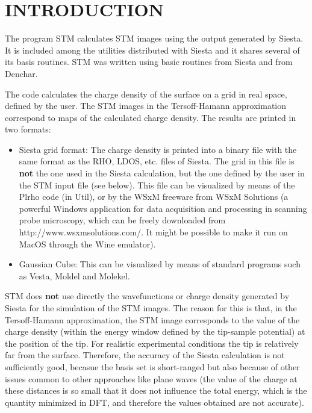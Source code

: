 
\tableofcontents

\newpage



\section{INTRODUCTION}

The program {\sc STM} calculates STM images using the output
generated by {\sc Siesta}.
It is included among the utilities distributed with {\sc Siesta}
and it shares several of its basis routines. 
{\sc STM} was written using basic routines from 
{\sc Siesta} and from {\sc Denchar}.

The code calculates the charge density of the surface
on a grid in real space, defined by the user. The STM images
in the Tersoff-Hamann approximation correspond to maps of
the calculated charge density. 
The results are printed in two formats:

\begin{itemize} 

\item{{\sc Siesta} grid format:}
The charge density is printed into a binary file with the same
format as the RHO, LDOS, etc. files of {\sc Siesta}. The grid
in this file is {\bf not} the one used in the {\sc Siesta}
calculation, but the one defined by the user in the {\sc STM}
input file (see below).
This file can be visualized by means of the {\sc Plrho}
code (in Util), or by the WSxM freeware from WSxM Solutions
(a powerful Windows application for data 
acquisition and processing in scanning probe microscopy,
which can be freely downloaded from http://www.wsxmsolutions.com/. It
might be possible to make it run on MacOS through the Wine emulator).


\item{Gaussian Cube:}
This can be visualized by means of standard programs
such as {\sc Vesta}, {\sc Moldel} and {\sc Molekel}.


\end{itemize}

{\sc STM} does {\bf not} use directly the wavefunctions or charge density
generated by {\sc Siesta} for the simulation of the STM images. The
reason for this is that, in the Tersoff-Hamann approximation,
the STM image corresponds to the value of the charge density
(within the energy window defined by the tip-sample potential)
at the position of the tip. For realistic experimental conditions
the tip is relatively far from the surface. Therefore, the accuracy
of the {\sc Siesta} calculation is not sufficiently good, becasue
the basis set is short-ranged but also because of other issues
common to other approaches like plane waves (the value of the charge
at these distances is so small that it does not influence the
total energy, which is the quantity minimized in DFT, and therefore
the values obtained are not accurate).

